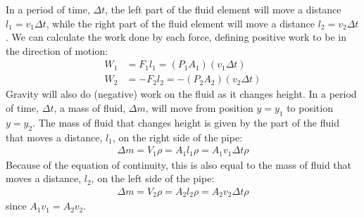 {{In a period of time, $\Delta t$, the left part of the fluid element will move a distance $l_1 = v_1 \Delta t$, while the right part of the fluid element will move a distance $l_2=v_2\Delta t$. We can calculate the work done by each force, defining positive work to be in the direction of motion:
\begin{align*}
W_1 &=  F_1l_1 = (P_1A_1)(v_1 \Delta t)\\
W_2 &= -F_2l_2 = -(P_2A_2)(v_2 \Delta t)
\end{align*}
Gravity will also do (negative) work on the fluid as it changes height. In a period of time, $\Delta t$, a mass of fluid, $\Delta m$, will move from position $y=y_1$ to position $y=y_2$. The mass of fluid that changes height is given by the part of the fluid that moves a distance, $l_1$, on the right side of the pipe:
\begin{align*}
\Delta m = V_1 \rho = A_1 l_1 \rho = A_1 v_1 \Delta t \rho 
\end{align*}
Because of the equation of continuity, this is also equal to the mass of fluid that moves a distance, $l_2$, on the left side of the pipe:
\begin{align*}
\Delta m = V_2 \rho = A_2 l_2 \rho = A_2 v_2 \Delta t \rho 
\end{align*}
since $A_1v_1 = A_2 v_2$.

}}
